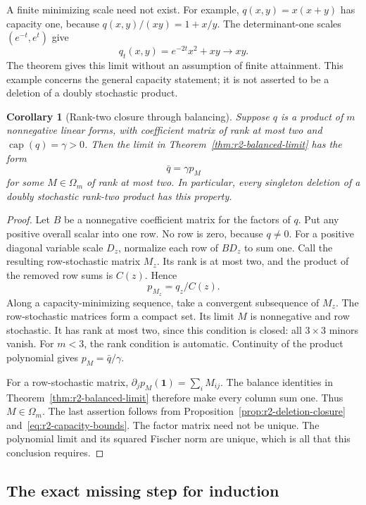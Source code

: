 \documentclass[11pt,a4paper]{article}
\newtheorem{corollary}[theorem]{Corollary}
\theoremstyle{definition}
\theoremstyle{remark}
\begin{document}
A finite minimizing scale need not exist.
For example, $q(x,y)=x(x+y)$ has capacity one, because $q(x,y)/(xy)=1+x/y$.
The determinant-one scales $(e^{-t},e^t)$ give
\[
 q_t(x,y)=e^{-2t}x^2+xy\longrightarrow xy.
\]
The theorem gives this limit without an assumption of finite attainment.
This example concerns the general capacity statement; it is not asserted to be a deletion of a doubly stochastic product.

\begin{corollary}[Rank-two closure through balancing]\label{cor:r2-balanced-product}
Suppose $q$ is a product of $m$ nonnegative linear forms, with coefficient matrix of rank at most two and $\operatorname{cap}(q)=\gamma>0$.
Then the limit in Theorem~\ref{thm:r2-balanced-limit} has the form
\[
 \bar q=\gamma p_M
\]
for some $M\in\Omega_m$ of rank at most two.
In particular, every singleton deletion of a doubly stochastic rank-two product has this property.
\end{corollary}

\begin{proof}
Let $B$ be a nonnegative coefficient matrix for the factors of $q$.
Put any positive overall scalar into one row.
No row is zero, because $q\ne0$.
For a positive diagonal variable scale $D_z$, normalize each row of $BD_z$ to sum one.
Call the resulting row-stochastic matrix $M_z$.
Its rank is at most two, and the product of the removed row sums is $C(z)$.
Hence
\[
 p_{M_z}=q_z/C(z).
\]
Along a capacity-minimizing sequence, take a convergent subsequence of $M_z$.
The row-stochastic matrices form a compact set.
Its limit $M$ is nonnegative and row stochastic.
It has rank at most two, since this condition is closed: all $3\times3$ minors vanish.
For $m<3$, the rank condition is automatic.
Continuity of the product polynomial gives $p_M=\bar q/\gamma$.

For a row-stochastic matrix,
$\partial_jp_M(\mathbf1)=\sum_i M_{ij}$.
The balance identities in Theorem~\ref{thm:r2-balanced-limit} therefore make every column sum one.
Thus $M\in\Omega_m$.
The last assertion follows from Proposition~\ref{prop:r2-deletion-closure} and~\eqref{eq:r2-capacity-bounds}.
The factor matrix need not be unique.
The polynomial limit and its squared Fischer norm are unique, which is all that this conclusion requires.
\end{proof}

\subsection{The exact missing step for induction}
\end{document}

